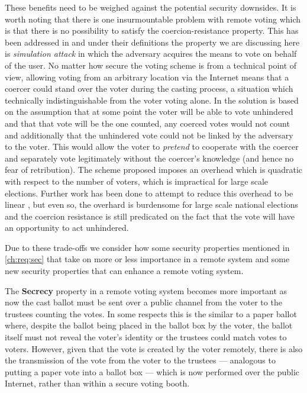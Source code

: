 These benefits need to be weighed against the potential security downsides. It is worth noting that there is one insurmountable problem with remote voting which is that there is no possibility to satisfy the coercion-resistance property. This has been addressed in \cite{juelsCoercionResistantElectronicElections2002} and under their definitions the property we are discussing here is \emph{simulation attack} in which the adversary acquires the means to vote on behalf of the user. No matter how secure the voting scheme is from a technical point of view, allowing voting from an arbitrary location via the Internet means that a coercer could stand over the voter during the casting process, a situation which technically indistinguishable from the voter voting alone. In \cite{juelsCoercionResistantElectronicElections2002} the solution is based on the assumption that at some point the voter will be able to vote unhindered and that that vote will be the one counted, any coerced votes would not count and additionally that the unhindered vote could not be linked by the adversary to the voter. This would allow the voter to \emph{pretend} to cooperate with the coercer and separately vote legitimately without the coercer's knowledge (and hence no fear of retribution). The scheme proposed imposes an overhead which is quadratic with respect to the number of voters, which is impractical for large scale elections. Further work has been done to attempt to reduce this overhead to be linear \cite{weberCoercionResistantElectronicElections2007a}, but even so, the overhard is burdensome for large scale national elections and the coercion resistance is still predicated on the fact that the vote will have an opportunity to act unhindered.

Due to these trade-offs we consider how some security properties mentioned in \autoref{ch:req:sec} that take on more or less importance in a remote system and some new security properties that can enhance a remote voting system.

The \textbf{Secrecy} property in a remote voting system becomes more important as now the cast ballot must be sent over a public channel from the voter to the trustees counting the votes. In some respects this is the similar to a paper ballot where, despite the ballot being placed in the ballot box by the voter, the ballot itself must not reveal the voter's identity or the trustees could match votes to voters. However, given that the vote is created by the voter remotely, there is also the transmission of the vote from the voter to the trustees --- analogous to putting a paper vote into a ballot box --- which is now performed over the public Internet, rather than within a secure voting booth.

